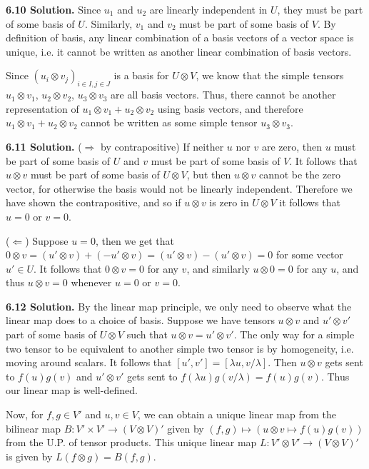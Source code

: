 \textbf{6.10 Solution.} Since $u_1$ and $u_2$ are linearly independent in $U$, they must be part of some basis of $U$. Similarly, $v_1$ and $v_2$ must be part of some basis of $V$. By definition of basis, any linear combination of a basis vectors of a vector space is unique, i.e. it cannot be written as another linear combination of basis vectors.

Since $(u_i \otimes v_j)_{i \in I, j \in J}$ is a basis for $U \otimes V$, we know that the simple tensors $u_1 \otimes v_1$, $u_2 \otimes v_2$, $u_3 \otimes v_3$ are all basis vectors. Thus, there cannot be another representation of $u_1 \otimes v_1 + u_2 \otimes v_2$ using basis vectors, and therefore $u_1 \otimes v_1 + u_2 \otimes v_2$ cannot be written as some simple tensor $u_3 \otimes v_3$.

\textbf{6.11 Solution.} ($\Rightarrow$ by contrapositive) If neither $u$ nor $v$ are zero, then $u$ must be part of some basis of $U$ and $v$ must be part of some basis of $V$. It follows that $u \otimes v$ must be part of some basis of $U \otimes V$, but then $u \otimes v$ cannot be the zero vector, for otherwise the basis would not be linearly independent. Therefore we have shown the contrapositive, and so if $u \otimes v$ is zero in $U \otimes V$ it follows that $u = 0$ or $v = 0$.

($\Leftarrow$) Suppose $u = 0$, then we get that $0 \otimes v = (u' \otimes v) + (-u' \otimes v) = (u' \otimes v) - (u' \otimes v) = 0$ for some vector $u' \in U$. It follows that $0 \otimes v = 0$ for any $v$, and similarly $u \otimes 0 = 0$ for any $u$, and thus $u \otimes v = 0$ whenever $u = 0$ or $v = 0$.

\textbf{6.12 Solution.} By the linear map principle, we only need to observe what the linear map does to a choice of basis. Suppose we have tensors $u \otimes v$ and $u' \otimes v'$ part of some basis of $U \otimes V$ such that $u \otimes v = u' \otimes v'$. The only way for a simple two tensor to be equivalent to another simple two tensor is by homogeneity, i.e. moving around scalars. It follows that $[u', v'] = [\lambda u, v / \lambda]$. Then $u \otimes v$ gets sent to $f(u)g(v)$ and $u' \otimes v'$ gets sent to $f(\lambda u)g(v / \lambda) = f(u)g(v)$. Thus our linear map is well-defined. 

Now, for $f, g \in V'$ and $u, v \in V$, we can obtain a unique linear map from the bilinear map $B: V' \times V' \to (V \otimes V)'$ given by $(f,g) \mapsto (u \otimes v \mapsto f(u)g(v))$ from the U.P. of tensor products. This unique linear map $L: V' \otimes V' \to (V \otimes V)'$ is given by $L(f \otimes g) = B(f, g)$.

